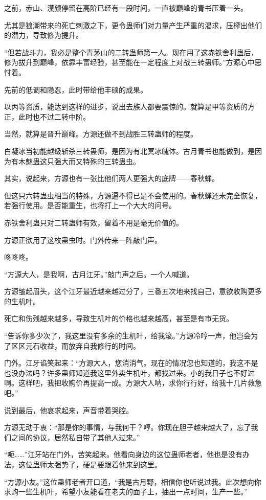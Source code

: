 \begin{this_body}
之前，赤山、漠颜停留在高阶已经有一段时间，一直被巅峰的青书压着一头。

尤其是狼潮带来的死亡刺激之下，更令蛊师们对力量产生严重的渴求，压榨出他们的潜力，导致修为提升。

“但若战斗力，我必是整个青茅山的二转蛊师第一人。现在用了这赤铁舍利蛊后，修为拔升到巅峰，依靠丰富经验，甚至能在一定程度上对战三转蛊师。”方源心中思忖着。

先前的低调和隐忍，此时带给他丰硕的成果。

以丙等资质，能达到这样的进步，说出去族人都要震惊的。就算是甲等资质的方正，此时也不过二转中阶。

当然，就算是晋升巅峰。方源还做不到战胜三转蛊师的程度。

白凝冰当初能越级斩杀三转蛊师，是因为有北冥冰魄体。古月青书也能做到，是因为有木魅蛊这只强大而又特殊的三转蛊虫。

其实，说起来，方源也有一张比他们两人更强大的底牌——春秋蝉。

但这只六转蛊虫相当的特殊，方源逼不得已是不会使用的。春秋蝉还未完全恢复，若强行使用。是否能重生，也将打上一个大大的问号。

赤铁舍利蛊只对二转蛊师有效，留着不用是毫无价值的。

方源正欲用了这枚蛊虫时。门外传来一阵敲门声。

咚咚咚。

“方源大人，是我啊，古月江牙。”敲门声之后。一个人喊道。

方源皱起眉头，这个江牙最近越来越过分了，三番五次地来找自己，意欲收购更多的生机叶。

死亡和伤残越来越多，导致生机叶的价格也越来越高，甚至是有市无货。

“告诉你多少次了，我这里没有多余的生机叶，给我滚。”方源冷哼一声，他岂会为了区区元石收益，而放弃自我修行的时间。

门外。江牙谄笑起来：“方源大人，您消消气。现在的情况您也知道的，我这不是也没办法吗？许多蛊师知道我这里外卖生机叶，都找过来。小的我日子也不好过啊。这样吧，我把收购价再提高一成。方源大人呐，求你行行好，给我十几片救急吧。”

说到最后，他哀求起来，声音带着哭腔。

方源无动于衷：“那是你的事情，与我何干？哼。你现在胆子越来越大了，忘了我们之间的协议，居然私自带了其他人过来。”

“呃……”江牙站在门外，苦笑起来。他看向身边的这位蛊师老者，他也是没有办法，这位蛊师太强势了，硬是要跟着他来到这里。

“方源小友。”这位蛊师老者开口道，“我是古月野，相信你也听说过我。此次想向你求购一些生机叶，希望小友能看在老夫的面子上，抽出一点时间，生产一些。”


\end{this_body}
